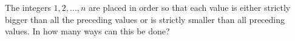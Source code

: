 The integers $ 1,2,...,n$ are placed in order so that each value is either strictly bigger than all the preceding values or is strictly smaller than all preceding values. In how many ways can this be done?
